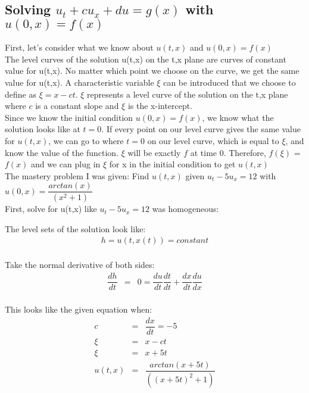 \documentclass{article}
\newcommand{\bea}{\begin{eqnarray*}}
\newcommand{\eea}{\end{eqnarray*}}
\newcommand{\blue}[1]{\textcolor{blue}{#1}}
\begin{document}
\subsection{Solving $u_t+cu_x +du = g(x)$ with $u(0,x)=f(x)$}

First, let's consider what we know about $u(t,x)$ and $u(0,x)=f(x)$ \\

The level curves of the solution u(t,x) on the t,x plane are curves of constant value for u(t,x). No matter which point we choose on the curve, we get the same value for u(t,x). A characteristic variable $\xi$ can be introduced that we choose to define as $\xi = x-ct$. $\xi$ represents a level curve of the solution on the t,x plane where $c$ is a constant slope and $\xi$ is the x-intercept.\\

Since we know the initial condition $u(0,x) = f(x)$, we know what the solution looks like at $t=0$. If every point on our level curve gives the same value for $u(t,x)$, we can go to where $t=0$ on our level curve, which is equal to $\xi$, and know the value of the function. $\xi$ will be exactly $f$ at time 0. Therefore, $f(\xi)$ = $f(x)$ and we can plug in $\xi$ for x in the initial condition to get $u(t,x)$ \\

The mastery problem I was given: Find $u(t,x)$ given $u_t-5u_x=12$ with $u(0,x) = \dfrac{arctan(x)}{(x^2+1)}$ \\

First, solve for u(t,x) like $u_t-5u_x=12$ was homogeneous:\newline 

The level sets of the solution look like:
\bea
h = u(t,x(t)) = constant \\
\eea

Take the normal derivative of both sides:
\bea
\dfrac{dh}{dt} &=& 0  = \dfrac{du}{dt}\dfrac{dt}{dt} + \dfrac{dx}{dt}\dfrac{du}{dx}\\
\eea

This looks like the given equation when:
\bea
c &=& \dfrac{dx}{dt} = -5 \\
\xi &=& x-ct \\
\xi &=& x+5t  \\
u(t,x) &=& \dfrac{arctan(x+5t)}{((x+5t)^2+1)}  \\
\eea
\end{document}
